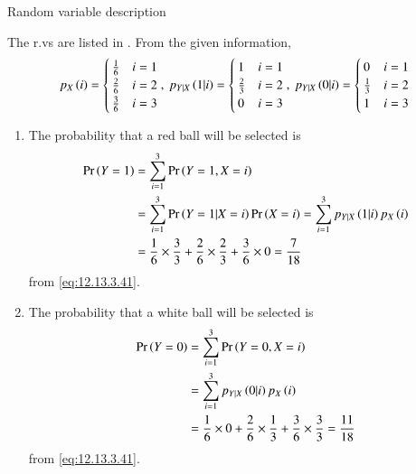 \begin{table}[!ht]

\caption{Random variable description}
\label{tab:exemplar 12.13.3.41}
\end{table}
The r.vs are listed in 
.  From the given information,
\begin{align}
\label{eq:12.13.3.41}
p_{X}\brak{i}=
\begin{cases}
\frac{1}{6} & i=1\\
\frac{2}{6} & i=2\\
\frac{3}{6} & i=3
\end{cases}
,\
p_{Y|X}\brak{1|i}=
\begin{cases}
1 & i=1\\
\frac{2}{3} & i=2\\
0 & i=3
\end{cases}
,\
p_{Y|X}\brak{0|i}=
\begin{cases}
0 & i=1\\
\frac{1}{3} & i=2\\
1 & i=3
\end{cases}
\end{align}
%
\begin{enumerate}
\item
The probability that a red ball will be selected is
\begin{align}
	\Pr\left(Y=1\right)&=\sum_{i=1}^{3}\Pr\left(Y=1,X=i\right)\\
&=\sum_{i=1}^{3}\Pr\left(Y=1 | X=i\right)\Pr\left(X=i\right) 
=\sum_{i=1}^{3}p_{Y|X}\left(1|i\right)p_{X}\left(i\right) \\
&=\frac{1}{6}\times\frac{3}{3}+\frac{2}{6}\times\frac{2}{3}+\frac{3}{6}\times0
=\frac{7}{18}
\end{align}
from \eqref{eq:12.13.3.41}.
\item
The probability that a white ball will be selected is
\begin{align}
	\Pr\left(Y=0\right)&=\sum_{i=1}^{3}\Pr\left(Y=0,X=i\right)\\
		&=\sum_{i=1}^{3}p_{Y|X}\left(0|i\right)p_{X}\left(i\right) \\
&=\frac{1}{6}\times0+\frac{2}{6}\times\frac{1}{3}+\frac{3}{6}\times\frac{3}{3}
=\frac{11}{18}
\end{align}
from \eqref{eq:12.13.3.41}.
\end{enumerate}



